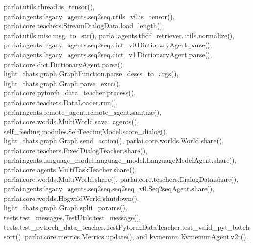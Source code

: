 parlai.\+utils.\+thread.\+is\+\_\+tensor(), parlai.\+agents.\+legacy\+\_\+agents.\+seq2seq.\+utils\+\_\+v0.\+is\+\_\+tensor(), parlai.\+core.\+teachers.\+Stream\+Dialog\+Data.\+load\+\_\+length(), parlai.\+utils.\+misc.\+msg\+\_\+to\+\_\+str(), parlai.\+agents.\+tfidf\+\_\+retriever.\+utils.\+normalize(), parlai.\+agents.\+legacy\+\_\+agents.\+seq2seq.\+dict\+\_\+v0.\+Dictionary\+Agent.\+parse(), parlai.\+agents.\+legacy\+\_\+agents.\+seq2seq.\+dict\+\_\+v1.\+Dictionary\+Agent.\+parse(), parlai.\+core.\+dict.\+Dictionary\+Agent.\+parse(), light\+\_\+chats.\+graph.\+Graph\+Function.\+parse\+\_\+descs\+\_\+to\+\_\+args(), light\+\_\+chats.\+graph.\+Graph.\+parse\+\_\+exec(), parlai.\+core.\+pytorch\+\_\+data\+\_\+teacher.\+process(), parlai.\+core.\+teachers.\+Data\+Loader.\+run(), parlai.\+agents.\+remote\+\_\+agent.\+remote\+\_\+agent.\+sanitize(), parlai.\+core.\+worlds.\+Multi\+World.\+save\+\_\+agents(), self\+\_\+feeding.\+modules.\+Self\+Feeding\+Model.\+score\+\_\+dialog(), light\+\_\+chats.\+graph.\+Graph.\+send\+\_\+action(), parlai.\+core.\+worlds.\+World.\+share(), parlai.\+core.\+teachers.\+Fixed\+Dialog\+Teacher.\+share(), parlai.\+agents.\+language\+\_\+model.\+language\+\_\+model.\+Language\+Model\+Agent.\+share(), parlai.\+core.\+agents.\+Multi\+Task\+Teacher.\+share(), parlai.\+core.\+worlds.\+Multi\+World.\+share(), parlai.\+core.\+teachers.\+Dialog\+Data.\+share(), parlai.\+agents.\+legacy\+\_\+agents.\+seq2seq.\+seq2seq\+\_\+v0.\+Seq2seq\+Agent.\+share(), parlai.\+core.\+worlds.\+Hogwild\+World.\+shutdown(), light\+\_\+chats.\+graph.\+Graph.\+split\+\_\+params(), tests.\+test\+\_\+messages.\+Test\+Utils.\+test\+\_\+message(), tests.\+test\+\_\+pytorch\+\_\+data\+\_\+teacher.\+Test\+Pytorch\+Data\+Teacher.\+test\+\_\+valid\+\_\+pyt\+\_\+batchsort(), parlai.\+core.\+metrics.\+Metrics.\+update(), and kvmemnn.\+Kvmemnn\+Agent.\+v2t().

